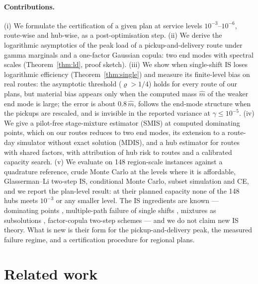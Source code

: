 \documentclass[11pt]{article}
\theoremstyle{definition}
\theoremstyle{remark}
\begin{document}
\paragraph{Contributions.}
(i) We formulate the certification of a given plan at service levels
$10^{-3}$--$10^{-6}$, route-wise and hub-wise, as a post-optimisation step.
(ii) We derive the logarithmic asymptotics of the peak load of a
pickup-and-delivery route under gamma marginals and a one-factor Gaussian
copula: two end modes with spectral scales (Theorem~\ref{thm:ld}, proof
sketch).
(iii) We show when single-shift IS loses logarithmic efficiency
(Theorem~\ref{thm:single}) and measure its finite-level bias on real routes:
the asymptotic threshold ($\varrho>1/4$) holds for every route of our plans,
but material bias appears only when the computed mass $\hat m$ of the weaker
end mode is large; the error is about $0.8\,\hat m$, follows the end-mode
structure when the pickups are rescaled, and is invisible in the reported
variance at $\gamma\le10^{-5}$.
(iv) We give a pilot-free stage-mixture estimator (SMIS) at computed
dominating points, which on our routes reduces to two end modes, its extension
to a route-day simulator without exact solution (MDIS), and a hub estimator for
routes with shared factors, with attribution of hub risk to routes and a
calibrated capacity search.
(v) We evaluate on 148 region-scale instances against a quadrature
reference, crude Monte Carlo at the levels where it is affordable,
Glasserman--Li two-step IS, conditional Monte Carlo, subset simulation and CE,
and we report the plan-level result: at their planned capacity none of the 148
hubs meets $10^{-3}$ or any smaller level.
The IS ingredients are known --- dominating points
\citep{SadowskyBucklew1990}, multiple-path failure of single shifts
\citep{GlassermanWang1997}, mixtures as subsolutions \citep{DupuisWang2007},
factor-copula two-step schemes \citep{GlassermanLi2005,BassambooJunejaZeevi2008}
--- and we do not claim new IS theory. What is new is their form for the
pickup-and-delivery peak, the measured failure regime, and a certification
procedure for regional plans.

\section{Related work}
\label{sec:related}
\end{document}
